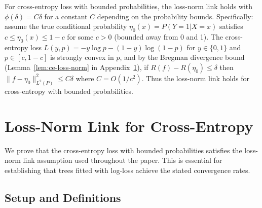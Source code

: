 %



For cross-entropy loss with bounded probabilities, the loss-norm link holds with $\phi(\delta) = C\delta$ for a constant $C$ depending on the probability bounds. Specifically: assume the true conditional probability $\eta_0(x) = P(Y=1|X=x)$ satisfies $c \le \eta_0(x) \le 1-c$ for some $c > 0$ (bounded away from 0 and 1). The cross-entropy loss $L(y, p) = -y \log p - (1-y) \log(1-p)$ for $y \in \{0,1\}$ and $p \in [c, 1-c]$ is strongly convex in $p$, and by the Bregman divergence bound (Lemma~\ref{lem:ce-loss-norm} in Appendix~\ref{app:loss-norm}), if $R(f) - R(\eta_0) \le \delta$ then $\|f - \eta_0\|_{L^2(P)}^2 \le C\delta$ where $C = O(1/c^2)$. Thus the loss-norm link holds for cross-entropy with bounded probabilities.



\section{Loss-Norm Link for Cross-Entropy}
\label{app:loss-norm}

We prove that the cross-entropy loss with bounded probabilities satisfies the loss-norm link assumption used throughout the paper. This is essential for establishing that trees fitted with log-loss achieve the stated convergence rates.

\subsection{Setup and Definitions}

